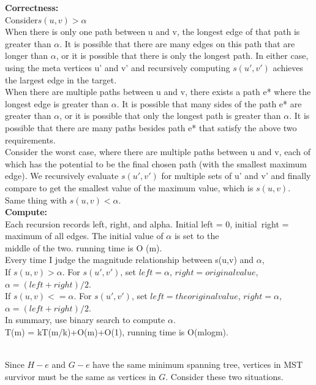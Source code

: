 \documentclass[12pt,a4paper]{article}
\newcommand{\question}[1]{\bigskip\noindent{\textbf{Q{#1} solution}}}
\begin{document}
\textbf{Correctness:}\\
Consider$ s(u,v)> \alpha$\\
When there is only one path between u and v, the longest edge of that path is greater than $\alpha$. It is possible that there are many edges on this path that are longer than $\alpha$, or it is possible that there is only the longest path. In either case, using the meta vertices u' and v' and recursively computing $s(u',v')$ achieves the largest edge in the target.\\
When there are multiple paths between u and v, there exists a path e* where the longest edge is greater than $\alpha$. It is possible that many sides of the path e* are greater than $\alpha$, or it is possible that only the longest path is greater than $\alpha$. It is possible that there are many paths besides path e* that satisfy the above two requirements.\\
Consider the worst case, where there are multiple paths between u and v, each of which has the potential to be the final chosen path (with the smallest maximum edge). We recursively evaluate $s(u',v')$ for multiple sets of u' and v' and finally compare to get the smallest value of the maximum value, which is $s(u,v)$.\\
Same thing with $s(u,v)< \alpha$.\\

\noindent
\textbf{Compute:}\\
Each recursion records left, right, and alpha. Initial left = 0, initial\ right = maximum of all edges. The initial value of $\alpha$ is set to the\\ middle of the two. running time is O (m).\\
Every time I judge the magnitude relationship between s(u,v) and $\alpha$,\\
If $s(u,v)> \alpha$. For $s(u',v')$, set $left = \alpha$, $right = original value$, $\alpha = (left+right)/2$.\\
If $s(u,v)<=\alpha$. For $s(u',v')$, set $left = the original value$, $right =\alpha$, $\alpha = (left+right)/2$.\\
In summary, use binary search to compute $\alpha$.\\
T(m) = kT(m/k)+O(m)+O(1), running time is O(mlogm).\\\\
\question{29.A}

Since $H - e$ and $G - e$ have the same minimum spanning tree, vertices in MST survivor must be the same as vertices in $G$. Consider these two situations.  
\end{document}

